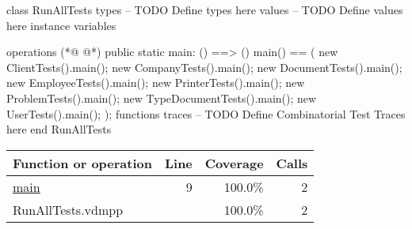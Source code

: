 \begin{vdmpp}[breaklines=true]
class RunAllTests
types
-- TODO Define types here
values
-- TODO Define values here
instance variables

operations
(*@
\label{main:9}
@*)
public static main: () ==> ()
 main() ==
 (
  new ClientTests().main();
  new CompanyTests().main();
  new DocumentTests().main();
  new EmployeeTests().main();
  new PrinterTests().main();
  new ProblemTests().main();
  new TypeDocumentTests().main();
  new UserTests().main();
 );
functions
traces
-- TODO Define Combinatorial Test Traces here
end RunAllTests
\end{vdmpp}
\bigskip
\begin{longtable}{|l|r|r|r|}
\hline
Function or operation & Line & Coverage & Calls \\
\hline
\hline
\hyperref[main:9]{main} & 9&100.0\% & 2 \\
\hline
\hline
RunAllTests.vdmpp & & 100.0\% & 2 \\
\hline
\end{longtable}

